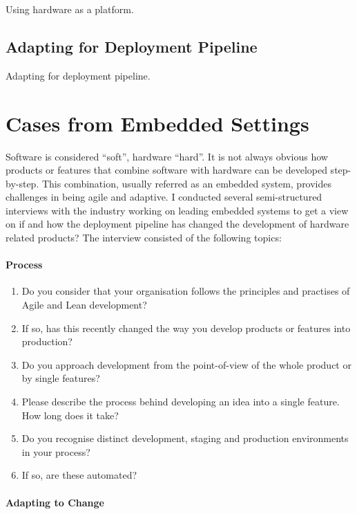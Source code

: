 \documentclass[english]{tktltiki2}
\begin{document}
Using hardware as a platform.

\subsection{Adapting for Deployment Pipeline}

Adapting for deployment pipeline.


\section{Cases from Embedded Settings}

Software is considered “soft”, hardware “hard”. It is not always obvious how products or features that combine software with hardware can be developed step-by-step. This combination, usually referred as an embedded system, provides challenges in being agile and adaptive. I conducted several semi-structured interviews with the industry working on leading embedded systems to get a view on if and how the deployment pipeline has changed the development of hardware related products? The interview consisted of the following topics:

\paragraph{Process}

\begin{enumerate}

    \item Do you consider that your organisation follows the principles and practises of Agile and Lean development?
    \item If so, has this recently changed the way you develop products or features into production?
    \item Do you approach development from the point-of-view of the whole product or by single features?
    \item Please describe the process behind developing an idea into a single feature. How long does it take?
    \item Do you recognise distinct development, staging and production environments in your process?
    \item If so, are these automated?

\end{enumerate}

\paragraph{Adapting to Change}
\end{document}
